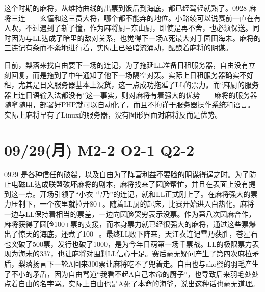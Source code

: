 这个时期的麻将，从维持曲线的出票到饭后到海底，都已经驾轻就熟了。0928 麻将三连——玄憧和这三员大将，哪个都不能弃的地位。小路绫可以说赛前一直在有人吹，不过遇到了新子憧，作为麻将厨+东山厨，即使是再不舍，也必须保送。同时因为与LL达成了暗里的敌对关系，也觉得下一场A死最大对手园田海未。麻将的三连记有条而不紊地进行着，实际上已经暗流涌动，酝酿着麻将的阴谋。

日前，梨落来找自由要下一场的连记，为了拖延LL准备日租服务器，自由没有立刻回复，而是拖到了中午通知了他下一场隔空对轰。实际上日租服务器确实不好租，尤其是日文服务器基本上没货，这一点成功拖延了LL的票力。而“麻厨的服务器上连日语输入法都没有”这一事实，则对麻将有着强大的优势——麻将的服务器随拿随用，部署好PHP就可以自动化了，而且不拘谨于服务器操作系统和语言。实际上麻将早有了Linux的服务器，没有图形界面对麻将反而是优势。

\section{09/29(月) M2-2 O2-1 Q2-2}


0929 是各种信任的破裂，以及自由为了阵营利益不要脸的阴谋得逞之时。为了防止电磁LL达成联盟破坏麻将的剧本，麻将找来了圆脸帮忙，并且在表面上没有提到这一点。开场引领了“小衣-雪乃”的连记，就和LL正式刚上了。在麻将强大的票力压制下，一个夜里就拉开80+。随着LL厨的起床，比赛开始进入白热化。麻将一边与LL保持着相当的票差，一边向圆脸哭穷表示没票。作为第八次圆麻合作，麻将获得了圆脸100+票的支援，而本身票力就已经很强大的麻将，通过这些票爆出了惊天的海底，还煮了100+。最终LL败下阵来，天江衣连记雪乃获胜，苍星石也突破了500票，发行也破了1000，是为今年日萌第一场千票战。LL的极限票力表现为海未的337，也让麻将对围剿LL信心十足。赛后毫无疑问产生了第四次麻拉矛盾，梨落扬言下一轮A回来300票让麻将吃不了兜着走。自由也与ako蜜的羽毛产生了不小的矛盾，因为自由骂道“我看不起A自己本命的厨子”，也导致后来羽毛处处点着自由的名字骂。实际上自由也是A死了本命的海爷，说出这种话也毫无道理。

